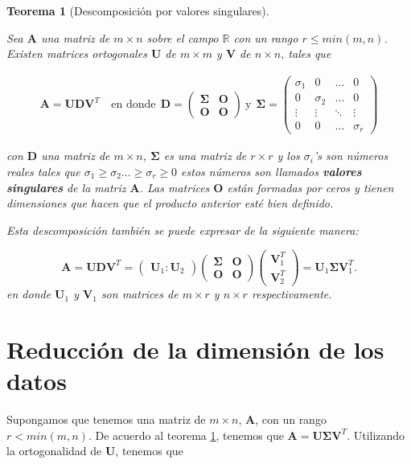 \documentclass[11pt]{report}
\theoremstyle{break}
\newtheorem{teorema}{Teorema}[chapter]
\theoremstyle{break}
\newcommand{\mbb}[1]{$\mathbb{#1}$}
\newcommand{\matdim}[2]{$#1 \times #2$}
\begin{document}
\begin{teorema}[Descomposición por valores singulares]
\label{teorema:descomposicion-svd}

Sea $\bm{A}$ una matriz de \matdim{m}{n} sobre el campo \mbb{R} con un rango $r \leq min(m,n)$. Existen matrices ortogonales $\bm{U}$ de \matdim{m}{m} y $\bm{V}$ de \matdim{n}{n}, tales que

$$
\begin{array}{lcr}
\bm{A} = \bm{UD}\bm{V}^{T} & \medspace \text{en donde} \medspace \medspace
\bm{D} = 
\begin{pmatrix}
\bm{\Sigma} & \bm{O} \\
\bm{O} & \bm{O}
\end{pmatrix}
\medspace \text{y} \medspace \medspace

\bm{\Sigma} = 
\begin{pmatrix}
\sigma_1 & 0 & \ldots & 0 \\
0 & \sigma_2 & \ldots & 0 \\
\vdots & \vdots & \ddots & \vdots \\
0 & 0 & \ldots & \sigma_r
\end{pmatrix}
\end{array}
$$

con $\bm{D}$ una matriz de \matdim{m}{n}, $\bm{\Sigma}$ es una matriz de \matdim{r}{r} y los $\sigma_i$'s son números reales tales que $\sigma_1 \geq \sigma_2 \ldots \geq \sigma_r \geq 0$ estos números son llamados \textbf{valores singulares} de la matriz $\bm{A}$. Las matrices $\bm{O}$ están formadas por ceros y tienen dimensiones que hacen que el producto anterior esté bien definido.

Esta descomposición también se puede expresar de la siguiente manera:

$$
\bm{A} = \bm{UD}\bm{V}^{T} = 
\begin{pmatrix}
\bm{U}_1 : \bm{U}_2 
\end{pmatrix}
\begin{pmatrix}
\bm{\Sigma} & \bm{O} \\
\bm{O} & \bm{O}
\end{pmatrix}
\begin{pmatrix}
\bm{V}_{1}^{T} \\
\bm{V}_{2}^{T}
\end{pmatrix}
= \bm{U}_{1} \bm{\Sigma} \bm{V}_{1}^{T}.
$$
en donde $\bm{U}_1$ y $\bm{V}_1$ son matrices de \matdim{m}{r} y \matdim{n}{r} respectivamente.
\end{teorema}

\section{Reducción de la dimensión de los datos}
\label{seccion:reduccion de la dimension}
Supongamos que tenemos una matriz de \matdim{m}{n}, $\bm{A}$, con un rango $r < min(m,n)$. De acuerdo al teorema \ref{teorema:descomposicion-svd}, tenemos que $\bm{A} = \bm{U\Sigma}\bm{V}^{T}$. Utilizando la ortogonalidad de $\bm{U}$, tenemos que
\end{document}
